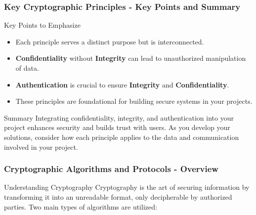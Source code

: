 \documentclass{beamer}
\begin{document}
\begin{frame}[fragile]
    \frametitle{Key Cryptographic Principles - Key Points and Summary}
    \begin{block}{Key Points to Emphasize}
        \begin{itemize}
            \item Each principle serves a distinct purpose but is interconnected.
            \item \textbf{Confidentiality} without \textbf{Integrity} can lead to unauthorized manipulation of data.
            \item \textbf{Authentication} is crucial to ensure \textbf{Integrity} and \textbf{Confidentiality}.
            \item These principles are foundational for building secure systems in your projects.
        \end{itemize}
    \end{block}

    \begin{block}{Summary}
        Integrating confidentiality, integrity, and authentication into your project enhances security and builds trust with users. 
        As you develop your solutions, consider how each principle applies to the data and communication involved in your project.
    \end{block}
\end{frame}

\begin{frame}[fragile]
    \frametitle{Cryptographic Algorithms and Protocols - Overview}
    \begin{block}{Understanding Cryptography}
        Cryptography is the art of securing information by transforming it into an unreadable format, only decipherable by authorized parties. Two main types of algorithms are utilized:
    \end{block}
\end{frame}
\end{document}
